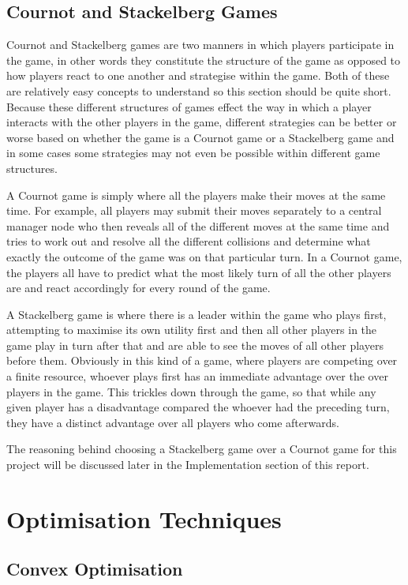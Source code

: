 \documentclass[a4paper, notitlepage]{report}
\begin{document}
\section{Cournot and Stackelberg Games}
\label{sec:orgfa9808b}
Cournot and Stackelberg games are two manners in which players participate in
the game, in other words they constitute the structure of the game as opposed to
how players react to one another and strategise within the game. Both of these
are relatively easy concepts to understand so this section should be quite
short. Because these different structures of games effect the way in which a
player interacts with the other players in the game, different strategies can be
better or worse based on whether the game is a Cournot game or a Stackelberg
game and in some cases some strategies may not even be possible within different
game structures.

A Cournot game is simply where all the players make their moves at the same
time. For example, all players may submit their moves separately to a central
manager node who then reveals all of the different moves at the same time and
tries to work out and resolve all the different collisions and determine what
exactly the outcome of the game was on that particular turn. In a Cournot game,
the players all have to predict what the most likely turn of all the other
players are and react accordingly for every round of the game.

A Stackelberg game is where there is a leader within the game who plays first,
attempting to maximise its own utility first and then all other players in the
game play in turn after that and are able to see the moves of all other players
before them. Obviously in this kind of a game, where players are competing over
a finite resource, whoever plays first has an immediate advantage over the over
players in the game. This trickles down through the game, so that while any
given player has a disadvantage compared the whoever had the preceding turn,
they have a distinct advantage over all players who come afterwards.

The reasoning behind choosing a Stackelberg game over a Cournot game for this
project will be discussed later in the Implementation section of this report.
\chapter{Optimisation Techniques}
\label{sec:org68d0a7c}
\section{Convex Optimisation}
\label{sec:org921042a}
\end{document}
